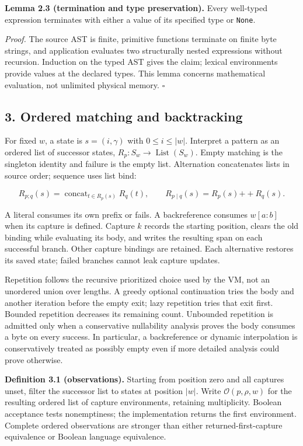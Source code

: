 \documentclass[
  11pt,
]{article}
\begin{document}
\textbf{Lemma 2.3 (termination and type preservation).} Every well-typed
expression terminates with either a value of its specified type or
\texttt{None}.

\emph{Proof.} The source AST is finite, primitive functions terminate on
finite byte strings, and application evaluates two structurally nested
expressions without recursion. Induction on the typed AST gives the
claim; lexical environments provide values at the declared types. This
lemma concerns mathematical evaluation, not unlimited physical memory.
\(\square\)

\hypertarget{ordered-matching-and-backtracking}{%
\subsection{3. Ordered matching and
backtracking}\label{ordered-matching-and-backtracking}}

For fixed \(w\), a state is \(s=(i,\gamma)\) with \(0\leq i\leq |w|\).
Interpret a pattern as an ordered list of successor states,
\(R_p:S_w\to\operatorname{List}(S_w)\). Empty matching is the singleton
identity and failure is the empty list. Alternation concatenates lists
in source order; sequence uses list bind:

\[
R_{p;q}(s)=\operatorname{concat}_{t\in R_p(s)}R_q(t),\qquad
R_{p\mid q}(s)=R_p(s)\mathbin{+\!+}R_q(s).
\]

A literal consumes its own prefix or fails. A backreference consumes
\(w[a:b]\) when its capture is defined. Capture \(k\) records the
starting position, clears the old binding while evaluating its body, and
writes the resulting span on each successful branch. Other capture
bindings are retained. Each alternative restores its saved state; failed
branches cannot leak capture updates.

Repetition follows the recursive prioritized choice used by the VM, not
an unordered union over lengths. A greedy optional continuation tries
the body and another iteration before the empty exit; lazy repetition
tries that exit first. Bounded repetition decreases its remaining count.
Unbounded repetition is admitted only when a conservative nullability
analysis proves the body consumes a byte on every success. In
particular, a backreference or dynamic interpolation is conservatively
treated as possibly empty even if more detailed analysis could prove
otherwise.

\textbf{Definition 3.1 (observations).} Starting from position zero and
all captures unset, filter the successor list to states at position
\(|w|\). Write \(\mathcal O(p,\rho,w)\) for the resulting ordered list
of capture environments, retaining multiplicity. Boolean acceptance
tests nonemptiness; the implementation returns the first environment.
Complete ordered observations are stronger than either
returned-first-capture equivalence or Boolean language equivalence.
\end{document}
